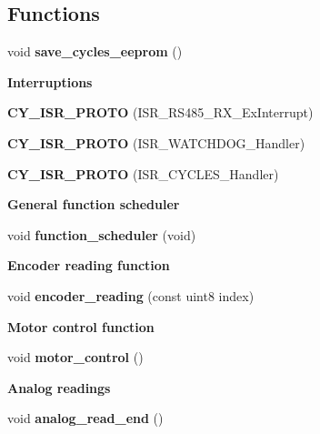 \subsection*{Functions}
\begin{DoxyCompactItemize}
\item 
void \textbf{ save\+\_\+cycles\+\_\+eeprom} ()
\end{DoxyCompactItemize}
\begin{Indent}\textbf{ Interruptions}\par
\begin{DoxyCompactItemize}
\item 
\textbf{ C\+Y\+\_\+\+I\+S\+R\+\_\+\+P\+R\+O\+TO} (I\+S\+R\+\_\+\+R\+S485\+\_\+\+R\+X\+\_\+\+Ex\+Interrupt)
\item 
\textbf{ C\+Y\+\_\+\+I\+S\+R\+\_\+\+P\+R\+O\+TO} (I\+S\+R\+\_\+\+W\+A\+T\+C\+H\+D\+O\+G\+\_\+\+Handler)
\item 
\textbf{ C\+Y\+\_\+\+I\+S\+R\+\_\+\+P\+R\+O\+TO} (I\+S\+R\+\_\+\+C\+Y\+C\+L\+E\+S\+\_\+\+Handler)
\end{DoxyCompactItemize}
\end{Indent}
\begin{Indent}\textbf{ General function scheduler}\par
\begin{DoxyCompactItemize}
\item 
void \textbf{ function\+\_\+scheduler} (void)
\end{DoxyCompactItemize}
\end{Indent}
\begin{Indent}\textbf{ Encoder reading function}\par
\begin{DoxyCompactItemize}
\item 
void \textbf{ encoder\+\_\+reading} (const uint8 index)
\end{DoxyCompactItemize}
\end{Indent}
\begin{Indent}\textbf{ Motor control function}\par
\begin{DoxyCompactItemize}
\item 
void \textbf{ motor\+\_\+control} ()
\end{DoxyCompactItemize}
\end{Indent}
\begin{Indent}\textbf{ Analog readings}\par
\begin{DoxyCompactItemize}
\item 
void \textbf{ analog\+\_\+read\+\_\+end} ()
\end{DoxyCompactItemize}
\end{Indent}
